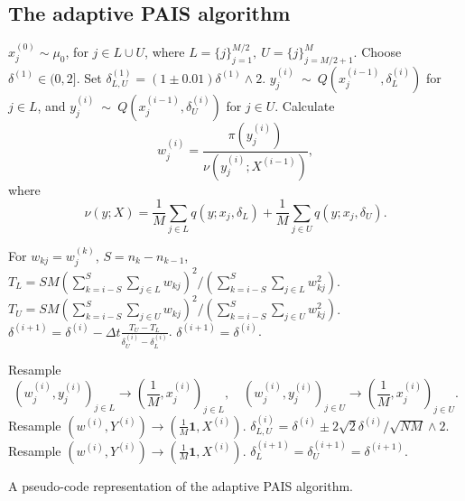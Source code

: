 \documentclass[final]{siamltex}
\begin{document}
\begin{appendix}
\section{The adaptive PAIS algorithm}\label{Sec:App}
\begin{table}[!h]
\begin{mdframed}
\begin{algorithmic}
\STATE $x_j^{(0)} \sim \mu_0$, for $j \in L\cup U$, where $L = \{j\}_{j=1}^{M/2},\ U = \{j\}_{j=M/2+1}^M$.
\STATE Choose $\delta^{(1)} \in (0, 2]$. Set $\delta_{L,U}^{(1)} = (1\pm 0.01)\delta^{(1)}\wedge 2$.
\STATE $y_j^{(i)}~\sim~Q(x_j^{(i-1)},\delta_L^{(i)})$ for $j \in L$, and $y_j^{(i)}~\sim~Q(x_j^{(i-1)},\delta_U^{(i)})$ for $j \in U$.
\STATE Calculate 
\[
	w^{(i)}_j = \frac{\pi(y_j^{(i)})}{\nu(y_j^{(i)};X^{(i-1)})},
\]
where
\[
	\nu(y;X) = \frac{1}{M}\sum_{j\in L} q(y;x_j,\delta_L)+\frac{1}{M}\sum_{j\in U} q(y;x_j,\delta_U).
\]

	\STATE For $w_{kj} = w_j^{(k)}$, $S = n_k - n_{k-1}$,
	\STATE $T_L = SM(\sum_{k=i-S}^S\sum_{j\in L} w_{kj})^2/(\sum_{k=i-S}^S\sum_{j\in L} w_{kj}^2)$.
	\STATE $T_U = SM(\sum_{k=i-S}^S\sum_{j\in U} w_{kj})^2/(\sum_{k=i-S}^S\sum_{j\in U} w_{kj}^2)$.
	\STATE $\delta^{(i+1)} = \delta^{(i)} - \Delta t \displaystyle\frac{T_U - T_L}{\delta_U^{(i)}-\delta_L^{(i)}}$.
\ELSE
	\STATE $\delta^{(i+1)} = \delta^{(i)}$.
\ENDIF

		\STATE Resample 
	\[
		(w_j^{(i)},y_j^{(i)})_{j\in L} \rightarrow (\frac{1}{M}, x_j^{(i)})_{j\in L}, \quad (w_j^{(i)},y_j^{(i)})_{j\in U} \rightarrow (\frac{1}{M}, x_j^{(i)})_{j\in U}.
\]
	\ELSE
		\STATE Resample $(w^{(i)},Y^{(i)}) \rightarrow (\frac{1}{M}\mathbf{1}, X^{(i)})$.
	\ENDIF
	\STATE $\delta_{L,U}^{(i)} = \delta^{(i)} \pm 2\sqrt{2}\delta^{(i)}/\sqrt{NM} \wedge 2$.
\ELSE
		\STATE Resample $(w^{(i)},Y^{(i)}) \rightarrow (\frac{1}{M}\mathbf{1}, X^{(i)})$.
		\STATE $\delta_L^{(i+1)} = \delta_U^{(i+1)} = \delta^{(i+1)}$.
\ENDIF
\ENDFOR
\end{algorithmic}
\end{mdframed}\caption{A pseudo-code representation of the adaptive
  PAIS algorithm.}
\label{tab:adapt}
\end{table}
\end{appendix}
\end{document}
